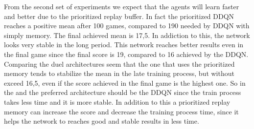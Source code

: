 \documentclass[10pt]{article}
\begin{document}
\begin{multicols}{2}
From the second set of experiments we expect that the agents will learn faster and better due to the prioritized replay buffer. In fact the prioritized DDQN reaches a positive mean after 100 games, compared to 190 needed by DDQN with simply memory. The final achieved mean is 17,5. In addiction to this, the network looks very stable in the long period. This network reaches better results even in the final game since the final score is 19, compared to 16 achieved by the DDQN. Comparing the duel architectures seem that the one that uses the prioritized memory tends to stabilize the mean in the late training process, but without exceed 16,5, even if the score achieved in the final game is the highest one. So in the and the preferred architecture should be the DDQN since the train process takes less time and it is more stable. In addition to this a prioritized replay memory can increase the score and decrease the training process time, since it helps the network to reaches good and stable results in less time.
\end{multicols}
\end{document}
